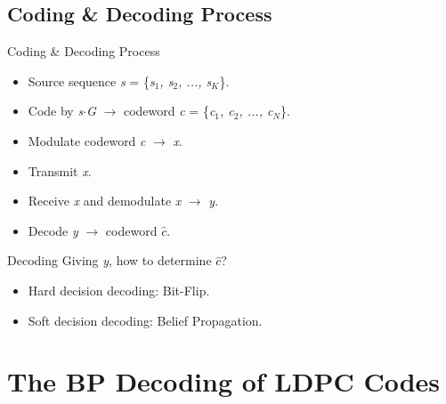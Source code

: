 \def\CTeXPreproc{Created by ctex v0.2.12, don't edit!}\documentclass{beamer}
\newcommand{\xieti}{\textsl}
\begin{document}
\subsection{Coding \& Decoding Process}
\begin{frame}
    \begin{block}{Coding \& Decoding Process}
        \begin{itemize}
        \item Source sequence \xieti{s} = \{\xieti{s$_1$, s$_2$, ..., s$_K$}\}.
        \item Code by \xieti{s$\cdot$G} $\rightarrow$ codeword \xieti{c} = \{\xieti{c$_1$, c$_2$, ..., c$_N$}\}.
        \item Modulate codeword \xieti{c} $\rightarrow$ \xieti{x}.
        \item Transmit \xieti{x}.
        \item Receive \xieti{x} and demodulate \xieti{x} $\rightarrow$ \xieti{y}.
        \item Decode \xieti{y} $\rightarrow$ codeword \xieti{$\hat{c}$}.
        \end{itemize}
    \end{block}
\end{frame}
\begin{frame}
    \begin{block}{Decoding}
        Giving \xieti{y}, how to determine \xieti{$\hat{c}$}?
        \begin{itemize}
            \item Hard decision decoding: Bit-Flip.
            \item Soft decision decoding: Belief Propagation.
        \end{itemize}
    \end{block}
\end{frame}

\section{The BP Decoding of LDPC Codes}
\end{document}
